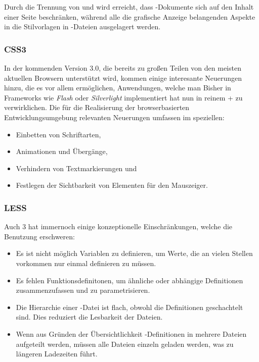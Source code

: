 Durch die Trennung von  und  wird erreicht, dass -Dokumente sich auf
den Inhalt einer Seite beschränken, während alle die grafische Anzeige  belangenden Aspekte in die
Stilvorlagen in -Dateien ausgelagert  werden.

\subsubsection{CSS3}

In der kommenden  Version 3.0, die bereits zu großen Teilen von den meisten aktuellen
Browsern unterstützt wird, kommen einige interesante Neuerungen hinzu, die es vor allem ermöglichen,
Anwendungen, welche man Bisher in Frameworks wie \textit{Flash} oder \textit{Silverlight}
implementiert hat nun in reinem + zu verwirklichen. Die für die Realisierung der
browserbasierten Entwicklungsumgebung relevanten Neuerungen umfassen im speziellen:

\begin{itemize}
  \item Einbetten von Schriftarten,
  \item Animationen und Übergänge,
  \item Verhindern von Textmarkierungen und
  \item Festlegen der Sichtbarkeit von Elementen für den Mauszeiger.
\end{itemize}

\subsubsection{LESS}

\label{sec:less}

Auch 3 hat immernoch einige konzeptionelle Einschränkungen, welche die Benutzung
erschweren:

\begin{itemize} 
  \item Es ist nicht möglich Variablen zu definieren, um Werte, die an
vielen Stellen vorkommen nur einmal definieren zu müssen. 
  \item Es fehlen Funktionsdefinitonen, um ähnliche
oder abhängige Definitionen  zusammenzufassen und zu parametrisieren. 
  \item Die Hierarchie einer
-Datei ist flach, obwohl die Definitionen geschachtelt sind. Dies reduziert die Lesbarkeit
der Dateien. 
  \item Wenn aus Gründen der Übersichtlichkeit -Definitionen in mehrere Dateien aufgeteilt
werden, müssen alle Dateien einzeln geladen werden, was zu längeren Ladezeiten führt. \end{itemize}

